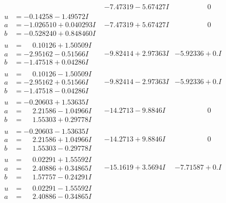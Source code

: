 \documentclass[1p]{elsarticle_modified}
\theoremstyle{definition}
\begin{document}
$$\begin{array}{c|c|c}
 & -7.47319 - 5.67427 I & \phantom{-0.000000 } 0 \\ \hline\begin{aligned}
u &= -0.14258 - 1.49572 I \\
a &= -1.026510 + 0.040293 I \\
b &= -0.528240 + 0.848460 I\end{aligned}
 & -7.47319 + 5.67427 I & \phantom{-0.000000 } 0 \\ \hline\begin{aligned}
u &= \phantom{-}0.10126 + 1.50509 I \\
a &= -2.95162 - 0.51566 I \\
b &= -1.47518 + 0.04286 I\end{aligned}
 & -9.82414 + 2.97363 I & -5.92336 + 0. I\phantom{ +0.000000I} \\ \hline\begin{aligned}
u &= \phantom{-}0.10126 - 1.50509 I \\
a &= -2.95162 + 0.51566 I \\
b &= -1.47518 - 0.04286 I\end{aligned}
 & -9.82414 - 2.97363 I & -5.92336 + 0. I\phantom{ +0.000000I} \\ \hline\begin{aligned}
u &= -0.20603 + 1.53635 I \\
a &= \phantom{-}2.21586 - 1.04966 I \\
b &= \phantom{-}1.55303 + 0.29778 I\end{aligned}
 & -14.2713 - 9.8846 I & \phantom{-0.000000 } 0 \\ \hline\begin{aligned}
u &= -0.20603 - 1.53635 I \\
a &= \phantom{-}2.21586 + 1.04966 I \\
b &= \phantom{-}1.55303 - 0.29778 I\end{aligned}
 & -14.2713 + 9.8846 I & \phantom{-0.000000 } 0 \\ \hline\begin{aligned}
u &= \phantom{-}0.02291 + 1.55592 I \\
a &= \phantom{-}2.40886 + 0.34865 I \\
b &= \phantom{-}1.57757 - 0.24291 I\end{aligned}
 & -15.1619 + 3.5694 I & -7.71587 + 0. I\phantom{ +0.000000I} \\ \hline\begin{aligned}
u &= \phantom{-}0.02291 - 1.55592 I \\
a &= \phantom{-}2.40886 - 0.34865 I \\

\end{aligned}
\end{array}$$
\end{document}
